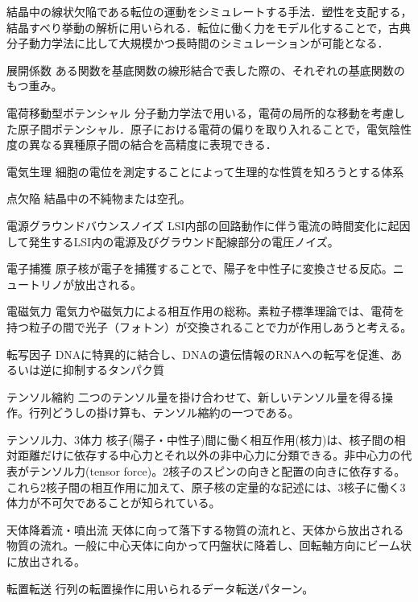 \begin{用語集}
{結晶中の線状欠陥である転位の運動をシミュレートする手法．塑性を支配する，結晶すべり挙動の解析に用いられる．転位に働く力をモデル化することで，古典分子動力学法に比して大規模かつ長時間のシミュレーションが可能となる．}
\item{展開係数}{}
{ある関数を基底関数の線形結合で表した際の、それぞれの基底関数のもつ重み。}
\item{電荷移動型ポテンシャル}{}
{分子動力学法で用いる，電荷の局所的な移動を考慮した原子間ポテンシャル．原子における電荷の偏りを取り入れることで，電気陰性度の異なる異種原子間の結合を高精度に表現できる．}
\item{電気生理}{}
{細胞の電位を測定することによって生理的な性質を知ろうとする体系}
\item{点欠陥}{}
{結晶中の不純物または空孔。}
\item{電源グラウンドバウンスノイズ}{}
{LSI内部の回路動作に伴う電流の時間変化に起因して発生するLSI内の電源及びグラウンド配線部分の電圧ノイズ。}
\item{電子捕獲}{}
{原子核が電子を捕獲することで、陽子を中性子に変換させる反応。ニュートリノが放出される。}
\item{電磁気力}{}
{電気力や磁気力による相互作用の総称。素粒子標準理論では、電荷を持つ粒子の間で光子（フォトン）が交換されることで力が作用しあうと考える。}
\item{転写因子}{}
{DNAに特異的に結合し、DNAの遺伝情報のRNAへの転写を促進、あるいは逆に抑制するタンパク質}
\item{テンソル縮約}{}
{二つのテンソル量を掛け合わせて、新しいテンソル量を得る操作。行列どうしの掛け算も、テンソル縮約の一つである。}
\item{テンソル力、3体力}{}
{核子(陽子・中性子)間に働く相互作用(核力)は、核子間の相対距離だけに依存する中心力とそれ以外の非中心力に分類できる。非中心力の代表がテンソル力(tensor force)。2核子のスピンの向きと配置の向きに依存する。これら2核子間の相互作用に加えて、原子核の定量的な記述には、3核子に働く3体力が不可欠であることが知られている。}
\item{天体降着流・噴出流}{}
{天体に向って落下する物質の流れと、天体から放出される物質の流れ。一般に中心天体に向かって円盤状に降着し、回転軸方向にビーム状に放出される。}
\item{転置転送}{}
{行列の転置操作に用いられるデータ転送パターン。}

\end{用語集}
